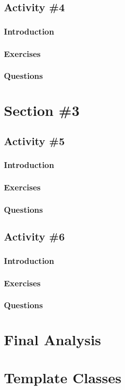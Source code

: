    \subsection{Activity \#4}
      \subsubsection{Introduction}
      \subsubsection{Exercises}
      \subsubsection{Questions}


  \pagebreak
  
  \section{Section \#3}
    \subsection{Activity \#5} %
      \subsubsection{Introduction}
      \subsubsection{Exercises}
      \subsubsection{Questions}

    \subsection{Activity \#6} %
      \subsubsection{Introduction}
      \subsubsection{Exercises}
      \subsubsection{Questions}

  \pagebreak

  \section{Final Analysis}

  \pagebreak

  \section{Template Classes}
